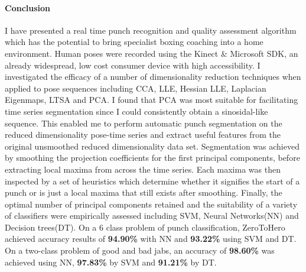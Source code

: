 \paragraph{Conclusion}
I have presented a real time punch recognition and quality assessment algorithm which has the potential to bring specialist boxing coaching into a home environment. Human poses were recorded using the Kinect \& Microsoft SDK, an already widespread, low cost consumer device with high accessibility. 
I investigated the efficacy of a number of dimensionality reduction techniques when applied to pose sequences including CCA, LLE, Hessian LLE, Laplacian Eigenmaps, LTSA and PCA. I found that PCA was most suitable for facilitating time series segmentation since I could consistently obtain a sinosidal-like sequence. This enabled me to perform automatic punch segmentation on the reduced dimensionality pose-time series and extract useful features from the original unsmoothed reduced dimensionality data set. Segmentation was achieved by smoothing the projection coefficients for the first principal components, before extracting local maxima from across the time series. Each maxima was then inspected by a set of heuristics which determine whether it signifies the start of a punch or is just a local maxima that still exists after smoothing.
Finally, the optimal number of principal components retained and the suitability of a variety of classifiers were empirically assessed including SVM, Neural Networks(NN) and Decision trees(DT). On a 6 class problem of punch classification, ZeroToHero achieved accuracy results of {\bf 94.90\%} with NN and {\bf 93.22\%} using SVM and DT. On a two-class problem of good and bad jabs, an accuracy of {\bf 98.60\%} was achieved using NN, {\bf 97.83\%} by SVM and {\bf 91.21\%} by DT.